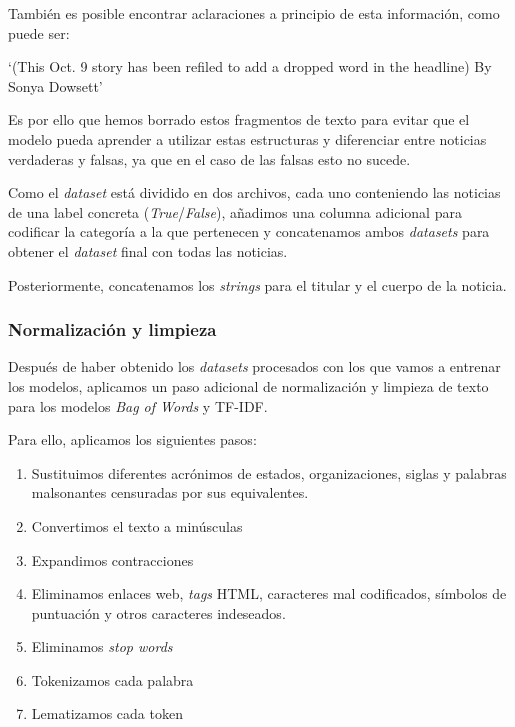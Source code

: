 También es posible encontrar aclaraciones a principio de esta información, como puede ser:

\begin{center}
\begin{BVerbatim*}
`(This Oct. 9 story has been refiled to add a 
dropped word in the headline) By Sonya Dowsett'
\end{BVerbatim*}
\end{center}

Es por ello que hemos borrado estos fragmentos de texto para evitar que el modelo pueda aprender a utilizar estas estructuras y diferenciar entre noticias verdaderas y falsas, ya que en el caso de las falsas esto no sucede.

Como el \textit{dataset} está dividido en dos archivos, cada uno conteniendo las noticias de una label concreta (\textit{True}/\textit{False}), añadimos una columna adicional para codificar la categoría a la que pertenecen y concatenamos ambos \textit{datasets} para obtener el \textit{dataset} final con todas las noticias.

Posteriormente, concatenamos los \emph{strings} para el titular y el cuerpo de la noticia.

\subsubsection{Normalización y limpieza}

Después de haber obtenido los \textit{datasets} procesados con los que vamos a entrenar los modelos, aplicamos un paso adicional de normalización y limpieza de texto para los modelos \textit{Bag of Words} y TF-IDF.

Para ello, aplicamos los siguientes pasos:
\begin{enumerate}
    \item Sustituimos diferentes acrónimos de estados, organizaciones, siglas y palabras malsonantes censuradas por sus equivalentes.
    \item Convertimos el texto a minúsculas
    \item Expandimos contracciones
    \item Eliminamos enlaces web, \emph{tags} HTML, caracteres mal codificados, símbolos de puntuación y otros caracteres indeseados.
    \item Eliminamos \emph{stop words}
    \item Tokenizamos cada palabra
    \item Lematizamos cada token
\end{enumerate}

